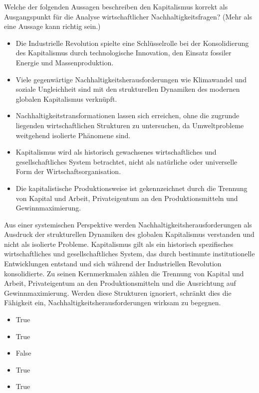 \documentclass[
  nswissgerman,
  a4paper,
  openany]{book}
\providecommand{\tightlist}{%
  \setlength{\itemsep}{0pt}\setlength{\parskip}{0pt}}
\begin{document}
Welche der folgenden Aussagen beschreiben den Kapitalismus korrekt als
Ausgangspunkt für die Analyse wirtschaftlicher Nachhaltigkeitsfragen?
(Mehr als eine Aussage kann richtig sein.)

\begin{itemize}
\tightlist
\item[$\square$]
  Die Industrielle Revolution spielte eine Schlüsselrolle bei der
  Konsolidierung des Kapitalismus durch technologische Innovation, den
  Einsatz fossiler Energie und Massenproduktion.
\item[$\square$]
  Viele gegenwärtige Nachhaltigkeitsherausforderungen wie Klimawandel
  und soziale Ungleichheit sind mit den strukturellen Dynamiken des
  modernen globalen Kapitalismus verknüpft.
\item[$\square$]
  Nachhaltigkeitstransformationen lassen sich erreichen, ohne die
  zugrunde liegenden wirtschaftlichen Strukturen zu untersuchen, da
  Umweltprobleme weitgehend isolierte Phänomene sind.
\item[$\square$]
  Kapitalismus wird als historisch gewachsenes wirtschaftliches und
  gesellschaftliches System betrachtet, nicht als natürliche oder
  universelle Form der Wirtschaftsorganisation.
\item[$\square$]
  Die kapitalistische Produktionsweise ist gekennzeichnet durch die
  Trennung von Kapital und Arbeit, Privateigentum an den
  Produktionsmitteln und Gewinnmaximierung.
\end{itemize}

Aus einer systemischen Perspektive werden
Nachhaltigkeitsherausforderungen als Ausdruck der strukturellen
Dynamiken des globalen Kapitalismus verstanden und nicht als isolierte
Probleme. Kapitalismus gilt als ein historisch spezifisches
wirtschaftliches und gesellschaftliches System, das durch bestimmte
institutionelle Entwicklungen entstand und sich während der
Industriellen Revolution konsolidierte. Zu seinen Kernmerkmalen zählen
die Trennung von Kapital und Arbeit, Privateigentum an den
Produktionsmitteln und die Ausrichtung auf Gewinnmaximierung. Werden
diese Strukturen ignoriert, schränkt dies die Fähigkeit ein,
Nachhaltigkeitsherausforderungen wirksam zu begegnen.

\begin{itemize}
\tightlist
\item
  True
\item
  True
\item
  False
\item
  True
\item
  True
\end{itemize}
\end{document}

